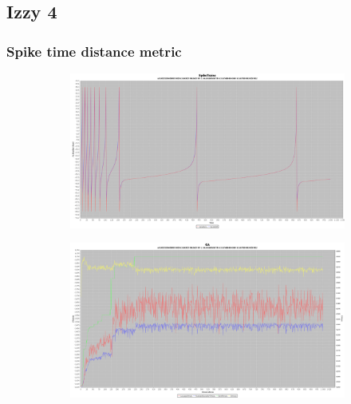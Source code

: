 \documentclass[10pt]{article}
\begin{document}
	\subsection{Izzy 4}
		\subsubsection{Spike time distance metric}
			\begin{figure}[H]
				\centering
					\begin{subfigure}{.5\textwidth}
						\centering
						\includegraphics[width=\linewidth]{./../images/izzy4/time/plot.png}
						
						\label{fig:sub10a}
					\end{subfigure}%
					\begin{subfigure}{.5\textwidth}
						\centering
						\includegraphics[width=\linewidth]{./../images/izzy4/time/prog.png}
						
						\label{fig:sub10b}
					\end{subfigure}
					
					\label{fig:plot10}
			\end{figure}
			
\end{document}
